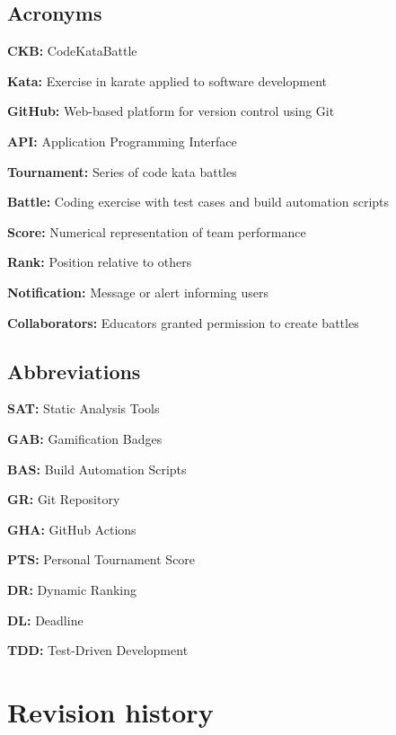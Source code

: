 \subsection{Acronyms}
\begin{description}[labelwidth=4em, leftmargin=5em, style=nextline]
    \item \textbf{CKB:} CodeKataBattle
    \item \textbf{Kata:} Exercise in karate applied to software development
    \item \textbf{GitHub:} Web-based platform for version control using Git
    \item \textbf{API:} Application Programming Interface
    \item \textbf{Tournament:} Series of code kata battles
    \item \textbf{Battle:} Coding exercise with test cases and build automation scripts
    \item \textbf{Score:} Numerical representation of team performance
    \item \textbf{Rank:} Position relative to others
    \item \textbf{Notification:} Message or alert informing users
    \item \textbf{Collaborators:} Educators granted permission to create battles
\end{description}

\subsection{Abbreviations}
\begin{description}[labelwidth=4em, leftmargin=5em, style=nextline]
    \item \textbf{SAT:} Static Analysis Tools
    \item \textbf{GAB:} Gamification Badges
    \item \textbf{BAS:} Build Automation Scripts
    \item \textbf{GR:} Git Repository
    \item \textbf{GHA:} GitHub Actions
    \item \textbf{PTS:} Personal Tournament Score
    \item \textbf{DR:} Dynamic Ranking
    \item \textbf{DL:} Deadline
    \item \textbf{TDD:} Test-Driven Development
\end{description}

\section{Revision history}



